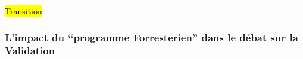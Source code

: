 







\hl{Transition}


\subsubsection{L'impact du \enquote{programme Forresterien} dans le débat sur la Validation}
\label{sssec:forrester_impact}

